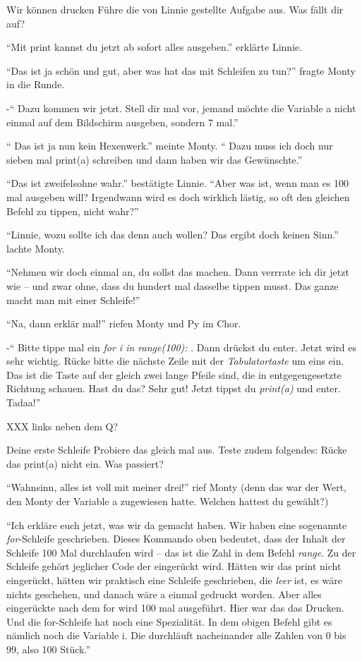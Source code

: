 \documentclass[a5paper,12pt,twoside,openright]{scrbook}
\begin{document}
\begin{aufgabe}{Wir können drucken}
 Führe die von Linnie gestellte Aufgabe aus. Was fällt dir auf?
\end{aufgabe}

"`Mit print kannst du jetzt ab sofort alles ausgeben."' erklärte Linnie.

"`Das ist ja schön und gut, aber was hat das mit Schleifen zu tun?"' fragte Monty in die Runde.

-"` Dazu kommen wir jetzt. Stell dir mal vor, jemand möchte die Variable a nicht einmal auf dem Bildschirm ausgeben, sondern 7 mal."'

"` Das ist ja nun kein Hexenwerk."' meinte Monty. "` Dazu muss ich doch nur sieben mal print(a) schreiben und dann haben wir das Gewünschte."'

"`Das ist zweifelsohne wahr."' bestätigte Linnie. "`Aber was ist, wenn man es 100 mal ausgeben will? 
Irgendwann wird es doch wirklich lästig, so oft den gleichen Befehl zu tippen, nicht wahr?"'

"`Linnie, wozu sollte ich das denn auch wollen? Das ergibt doch keinen Sinn."' lachte Monty.

"`Nehmen wir doch einmal an, du sollst das machen. Dann verrrate ich dir jetzt wie -- und zwar ohne, dass du hundert mal dasselbe tippen musst.
Das ganze macht man mit einer Schleife!"'

"`Na, dann erklär mal!"' riefen Monty und Py im Chor.

-"` Bitte tippe mal ein \emph{for i in range(100):} . Dann drückst du enter. 
Jetzt wird es sehr wichtig. Rücke bitte die nächste Zeile mit der \emph{Tabulatortaste} um eins ein. Das ist die Taste auf der gleich zwei lange Pfeile sind, die 
in entgegengesetzte Richtung schauen. Hast du das? Sehr gut! 
Jetzt tippst du \emph{print(a)} und enter. Tadaa!"'

XXX links neben dem Q?

\begin{aufgabe}{Deine erste Schleife}
 Probiere das gleich mal aus. 
 Teste zudem folgendes: Rücke das print(a) nicht ein. Was passiert?
\end{aufgabe}

"`Wahnsinn, alles ist voll mit meiner drei!"' rief Monty (denn das war der Wert, den Monty der Variable a zugewiesen hatte. 
Welchen hattest du gewählt?)

"`Ich erkläre euch jetzt, was wir da gemacht haben. Wir haben eine sogenannte \emph{for}-Schleife geschrieben.
Dieses Kommando oben bedeutet, dass der Inhalt der Schleife 100 Mal durchlaufen wird -- das ist die Zahl in dem Befehl \emph{range}.
Zu der Schleife gehört jeglicher Code der eingerückt wird. Hätten wir das print nicht eingerückt, hätten wir praktisch eine Schleife geschrieben, 
die \emph{leer} ist, es wäre nichts geschehen, und danach wäre a einmal gedruckt worden.
Aber alles eingerückte nach dem for wird 100 mal ausgeführt. Hier war das das Drucken.
Und die for-Schleife hat noch eine Spezialität. In dem obigen Befehl gibt es nämlich noch die Variable i.
Die durchläuft nacheinander alle Zahlen von 0 bis 99, also 100 Stück."'
\end{document}
